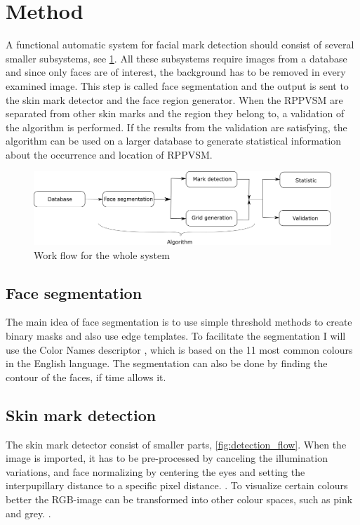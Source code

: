 \section{Method} \label{method}
A functional automatic system for facial mark detection should consist of several smaller subsystems, see \cref{fig:system_flow}. All these subsystems require images from a database and since only faces are of interest, the background has to be removed in every examined image. This step is called face segmentation and the output is sent to the skin mark detector and the face region generator. When the RPPVSM are separated from other skin marks and the region they belong to, a validation of the algorithm is performed. If the results from the validation are satisfying, the algorithm can be used on a larger database to generate statistical information about the occurrence and location of RPPVSM.  

\begin{figure}[H]
	\centering
	\includegraphics[width=1.0\linewidth]{"bilder/system_flow"}
	\caption{Work flow for the whole system}
	\label{fig:system_flow}
\end{figure}

\subsection{Face segmentation}

The main idea of face segmentation is to use simple threshold methods to create binary masks and also use edge templates. \cite{face_segmentation_skin} To facilitate the segmentation I will use the Color Names descriptor \cite{11_colours}, which is based on the 11 most common colours in the English language. The segmentation can also be done by finding the contour of the faces, if time allows it.  

\subsection{Skin mark detection}

The skin mark detector consist of smaller parts, \cref{fig:detection_flow}. When the image is imported, it has to be pre-processed by canceling the illumination variations, and face normalizing by centering the eyes and setting the interpupillary distance to a specific pixel distance. \cite{automatic_detector_2015}. To visualize certain colours better the RGB-image can be transformed into other colour spaces, such as pink and grey. \cite{11_colours}. 

